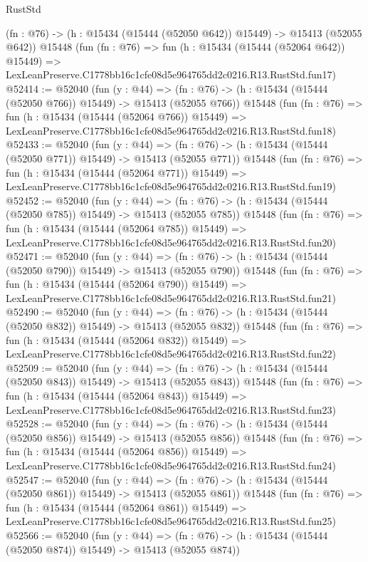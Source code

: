 \begin{lexlean}{RustStd}
\begin{coremodule}
    (fn : @76) -> (h : @15434 (@15444 (@52050 @642)) @15449) -> @15413 (@52055 @642))
    @15448
    (fun (fn : @76) =>
    fun (h : @15434 (@15444 (@52064 @642)) @15449) =>
    LexLeanPreserve.C1778bb16c1cfe08d5e964765dd2c0216.R13.RustStd.fun17)
@52414 := @52040
    (fun (y : @44) =>
    (fn : @76) -> (h : @15434 (@15444 (@52050 @766)) @15449) -> @15413 (@52055 @766))
    @15448
    (fun (fn : @76) =>
    fun (h : @15434 (@15444 (@52064 @766)) @15449) =>
    LexLeanPreserve.C1778bb16c1cfe08d5e964765dd2c0216.R13.RustStd.fun18)
@52433 := @52040
    (fun (y : @44) =>
    (fn : @76) -> (h : @15434 (@15444 (@52050 @771)) @15449) -> @15413 (@52055 @771))
    @15448
    (fun (fn : @76) =>
    fun (h : @15434 (@15444 (@52064 @771)) @15449) =>
    LexLeanPreserve.C1778bb16c1cfe08d5e964765dd2c0216.R13.RustStd.fun19)
@52452 := @52040
    (fun (y : @44) =>
    (fn : @76) -> (h : @15434 (@15444 (@52050 @785)) @15449) -> @15413 (@52055 @785))
    @15448
    (fun (fn : @76) =>
    fun (h : @15434 (@15444 (@52064 @785)) @15449) =>
    LexLeanPreserve.C1778bb16c1cfe08d5e964765dd2c0216.R13.RustStd.fun20)
@52471 := @52040
    (fun (y : @44) =>
    (fn : @76) -> (h : @15434 (@15444 (@52050 @790)) @15449) -> @15413 (@52055 @790))
    @15448
    (fun (fn : @76) =>
    fun (h : @15434 (@15444 (@52064 @790)) @15449) =>
    LexLeanPreserve.C1778bb16c1cfe08d5e964765dd2c0216.R13.RustStd.fun21)
@52490 := @52040
    (fun (y : @44) =>
    (fn : @76) -> (h : @15434 (@15444 (@52050 @832)) @15449) -> @15413 (@52055 @832))
    @15448
    (fun (fn : @76) =>
    fun (h : @15434 (@15444 (@52064 @832)) @15449) =>
    LexLeanPreserve.C1778bb16c1cfe08d5e964765dd2c0216.R13.RustStd.fun22)
@52509 := @52040
    (fun (y : @44) =>
    (fn : @76) -> (h : @15434 (@15444 (@52050 @843)) @15449) -> @15413 (@52055 @843))
    @15448
    (fun (fn : @76) =>
    fun (h : @15434 (@15444 (@52064 @843)) @15449) =>
    LexLeanPreserve.C1778bb16c1cfe08d5e964765dd2c0216.R13.RustStd.fun23)
@52528 := @52040
    (fun (y : @44) =>
    (fn : @76) -> (h : @15434 (@15444 (@52050 @856)) @15449) -> @15413 (@52055 @856))
    @15448
    (fun (fn : @76) =>
    fun (h : @15434 (@15444 (@52064 @856)) @15449) =>
    LexLeanPreserve.C1778bb16c1cfe08d5e964765dd2c0216.R13.RustStd.fun24)
@52547 := @52040
    (fun (y : @44) =>
    (fn : @76) -> (h : @15434 (@15444 (@52050 @861)) @15449) -> @15413 (@52055 @861))
    @15448
    (fun (fn : @76) =>
    fun (h : @15434 (@15444 (@52064 @861)) @15449) =>
    LexLeanPreserve.C1778bb16c1cfe08d5e964765dd2c0216.R13.RustStd.fun25)
@52566 := @52040
    (fun (y : @44) =>
    (fn : @76) -> (h : @15434 (@15444 (@52050 @874)) @15449) -> @15413 (@52055 @874))

\end{coremodule}
\end{lexlean}
